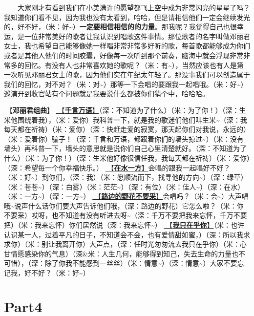 \documentclass[]{ctexbook}
\begin{document}
  大家刚才有看到我们在小美满许的愿望都飞上空中成为非常闪亮的星星了吗？我知道你们看不见，因为我也没有太看到，哈哈，但是请相信他们一定会继续发光的，好不好，（米：好\textasciitilde）\textbf{一定要相信相信的的力量}。那我呢？我觉得自己也很幸运，是一位非常美好的歌者让我认识到唱歌这件事情。那位歌者的名字叫做邓丽君女士，我也希望自己能够像她一样唱非常非常多好听的歌，每首歌都能够成为你们或者是其他人他们的时间胶囊，好像每一次听到那个前奏，脑海中就会浮现非常非常多的回忆。有没有人也非常喜欢她的歌呢？（米：有\textasciitilde），当然应该也有人是第一次听见邓丽君女士的歌，因为他们实在年纪太年轻了。那没事我们可以创造属于我们的回忆，对不对？（米：对\textasciitilde）那等一下会唱的要跟我一起唱哦。（米：好\textasciitilde）巡演开到收官站有个问题就是我要说什么都被你们猜个中，哈哈哈。

🎵【\textbf{邓丽君组曲}】
\hyperref[thousands-of-words]{🎵【\textbf{千言万语}】}（深：不知道为了什么）（米：为了你！）（深：生米他围绕着我），（米：爱你）我科普一下，就是我的歌迷们他们叫生米\textasciitilde（深：我每天都在祈祷）（米：爱你）（深：快赶走爱的寂寞，那天起你们对我说，永远的）（米：爱着你）骗子！（深：千言和万语，都跟着你们的墙头掠过\textasciitilde）（米：没有墙头）再科普一下，墙头的意思就是说你们自己心里清楚就好。（深：不知道为了什么）（米：为了你！）（深：生米他好像很信任我，我每天都在祈祷）（米：爱你）（深：希望每一个你幸福快乐。）
\hyperref[on-the-water-side]{🎵【\textbf{在水一方}】}会唱的跟我一起唱好不好？（米：好\textasciitilde）到你们，（深：我）（米：愿顺流而下，找寻他的方向\textasciitilde）（深：绿草）（米：苍苍\textasciitilde）（深：白雾）（米：茫茫\textasciitilde）（深：有位）（米：佳人\textasciitilde）（深：在水）（米：一方\textasciitilde）（深：一方\textasciitilde）
\hyperref[only-with-me]{🎵【\textbf{路边的野花不要采}】}会唱吗？（米：会\textasciitilde）大声唱哦\textasciitilde 说声什么话你们要大声告诉他们哦，（深：路边的野花）它怎么啦？（米：你不要采）哎呀，也不知道有没有听进去呀\textasciitilde（深：千万不要把我来忘怀，千万不要把）（米：我来忘怀）你们居然说（深：我来忘怀\textasciitilde）
\hyperref[only-you]{🎵【\textbf{我只在乎你}】}（米：也许认识某一人，过着平凡的日子，不知道会不会，也有爱情甜如蜜，）（深：所以我求求你）（米：别让我离开你）大声点，（深：任时光匆匆流去我只在乎你）（米：心甘情愿感染你的气息）（深\&米：人生几何，能够得到知己，失去生命的力量也不可惜），（深：除了你我不能感到一丝丝）（米：情意\textasciitilde）（深：情意\textasciitilde）大家不要忘记我，好不好？（米：好\textasciitilde）

\section{Part4}\label{nanning-20241207-part4}
\end{document}
